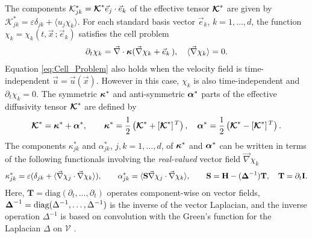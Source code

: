 \documentclass[11pt]{amsart}
\newcommand{\Tb}{\mathbf{T}}
\newcommand{\Hb}{\mathbf{H}}
\newcommand{\Ib}{\mathbf{I}}
\newcommand{\Sb}{\mathbf{S}}
\newcommand{\Kc}{\mathcal{K}}
\newcommand\Kbc{\mbox{\boldmath${\mathcal{K}}$}}
\newcommand{\Vc}{\mathcal{V}}
\newcommand\balpha{\mbox{\boldmath${\alpha}$}}
\newcommand\bDelta{\mbox{\boldmath${\Delta}$}}
\newcommand\bkappa{\mbox{\boldmath${\kappa}$}}
\begin{document}
The components $\Kc^*_{jk}=\Kbc^*\vec{e}_j\cdot\vec{e}_k$ of the effective
tensor $\Kbc^*$ are given by $\Kc^*_{jk}=\varepsilon\delta_{jk}+\langle u_j\chi_k\rangle$. For each
standard basis vector $\vec{e}_k$, $k=1,\ldots,d$, the function
$\chi_k=\chi_k(t,\vec{x}\,;\vec{e}_k)$ satisfies
\cite{Fannjiang:SIAM_JAM:333} the cell problem    
% 
\begin{align}\label{eq:Cell_Problem}
  \partial_t\chi_k=\vec{\nabla}\cdot\bkappa(\vec{\nabla}\chi_k+\vec{e}_k\,), \quad
  \langle\vec{\nabla}\chi_k\rangle=0.
\end{align}
%
Equation \eqref{eq:Cell_Problem} also holds
\cite{Fannjiang:SIAM_JAM:333} when the velocity field is
time-independent $\vec{u}=\vec{u}(\vec{x})$. However in this case, 
$\chi_k$ is also time-independent and $\partial_t\chi_k=0$. The symmetric $\bkappa^*$ and
anti-symmetric $\balpha^*$ parts of the effective diffusivity tensor
$\Kbc^*$ are defined by 
%
\begin{align}\label{eq:Symm_Anti-Symm}
  \Kbc^*=\bkappa^*+\balpha^*,\qquad
  \bkappa^*=\frac{1}{2}\left(\Kbc^*+[\Kbc^*]^{\,T}\right), \quad
  \balpha^*=\frac{1}{2}\left(\Kbc^*-[\Kbc^*]^{\,T}\right).
\end{align}
%
The components $\kappa^*_{jk}$ and $\alpha^*_{jk}$, $j,k=1,\ldots,d$, of $\bkappa^*$
and $\balpha^*$ can be written in terms of the following functionals
involving the \emph{real-valued} vector field $\vec{\nabla}\chi_k$
%
\begin{align}\label{eq:Eff_Diffusivity}
 \kappa^*_{jk}=\varepsilon(\delta_{jk}+\langle\vec{\nabla}\chi_j\cdot\vec{\nabla}\chi_k\rangle), \qquad
 \alpha^*_{jk}=\langle\Sb\vec{\nabla}\chi_j\cdot\vec{\nabla}\chi_k\rangle, \qquad
 \Sb=\Hb-(\bDelta^{-1})\Tb, \quad \Tb=\partial_t\Ib.
\end{align}
%
Here, $\Tb=\text{diag}(\partial_t,\ldots,\partial_t)$ operates component-wise on vector
fields, $\bDelta^{-1}=\text{diag}(\Delta^{-1},\ldots,\Delta^{-1})$ is the inverse of
the vector Laplacian, and the inverse operation $\Delta^{-1}$ is based on
convolution with the Green's function for the Laplacian $\Delta$ on $\Vc$
\cite{Stakgold:BVP:2000}.
\end{document}
